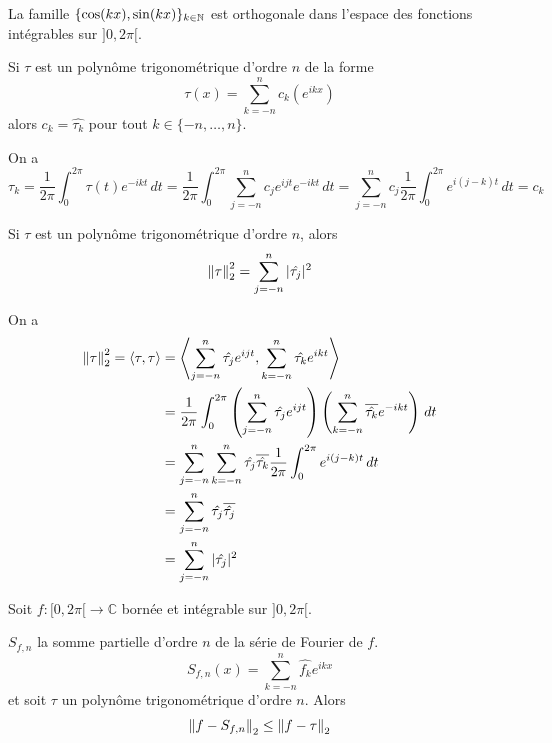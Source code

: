 \documentclass[a4paper, 12pt]{article}
\begin{document}
\begin{corollaire}{}{}
    La famille $\{ \cos(kx), \sin(kx) \}_{k \in \mathbb{N}}$ est orthogonale dans l'espace des fonctions intégrables sur $]0, 2\pi[$.
\end{corollaire}

\begin{corollaire}{}{}
    Si $\tau$ est un polynôme trigonométrique d'ordre $n$ de la forme
    $$
    \tau(x) = \sum_{k=-n}^n c_k (e^{ikx})
    $$
    alors $c_k = \hat{\tau_k}$ pour tout $k \in \{-n, \dots, n\}$.
\end{corollaire}

\begin{demonstration}
    On a
    $$
    \hat{\tau_k} = \frac{1}{2\pi} \int_0^{2\pi} \tau(t) e^{-ikt} \, dt = \frac{1}{2\pi} \int_0^{2\pi} \sum_{j=-n}^n c_j e^{ijt} e^{-ikt} \, dt = \sum_{j=-n}^n c_j \frac{1}{2\pi} \int_0^{2\pi} e^{i(j-k)t} \, dt = c_k
    $$
\end{demonstration}

\begin{corollaire}{}{}
    Si $\tau$ est un polynôme trigonométrique d'ordre $n$, alors
    $$
    \left\lVert\tau\right\rVert_2^2 = \sum_{j=-n}^n |\hat{\tau_j}|^2
    $$
\end{corollaire}

\begin{demonstration}
    On a
    \begin{align*}
        \left\lVert\tau\right\rVert_2^2 = \langle \tau, \tau \rangle &= \left\langle \sum_{j=-n}^n \hat{\tau_j} e^{ijt}, \sum_{k=-n}^n \hat{\tau_k} e^{ikt} \right\rangle \\
        &= \frac{1}{2\pi} \int_0^{2\pi} \left( \sum_{j=-n}^n \hat{\tau_j} e^{ijt} \right) \left( \sum_{k=-n}^n \overline{\hat{\tau_k}} e^{-ikt} \right) \, dt \\
        &= \sum_{j=-n}^n \sum_{k=-n}^n \hat{\tau_j} \overline{\hat{\tau_k}} \frac{1}{2\pi} \int_0^{2\pi} e^{i(j-k)t} \, dt \\
        &= \sum_{j=-n}^n \hat{\tau_j} \overline{\hat{\tau_j}} \\
        &= \sum_{j=-n}^n |\hat{\tau_j}|^2
    \end{align*}
\end{demonstration}

\begin{theoreme}{}{}
    Soit $f: [0, 2\pi[ \to \mathbb{C}$ bornée et intégrable sur $]0, 2\pi[$.

    $S_{f,n}$ la somme partielle d'ordre $n$ de la série de Fourier de $f$.
    $$
    S_{f,n}(x) = \sum_{k=-n}^n \hat{f_k} e^{ikx}
    $$
    et soit $\tau$ un polynôme trigonométrique d'ordre $n$. Alors
    $$
    \left\lVert f - S_{f,n}\right\rVert_2 \leq \left\lVert f - \tau\right\rVert_2
    $$
\end{theoreme}
\end{document}
